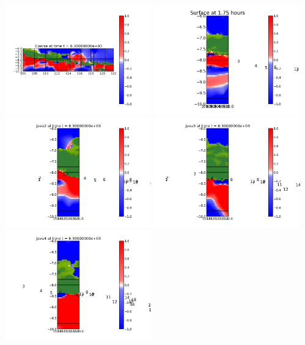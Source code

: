 \documentclass[11pt]{article}
\begin{document}
\vskip 10pt 
\includegraphics[width=0.475\textwidth]{frame0007fig0.png}
\includegraphics[width=0.475\textwidth]{frame0007fig15.png}
\vskip 10pt 
\includegraphics[width=0.475\textwidth]{frame0007fig25.png}
\includegraphics[width=0.475\textwidth]{frame0007fig20.png}
\vskip 10pt 
\includegraphics[width=0.475\textwidth]{frame0007fig30.png}
\end{document}
